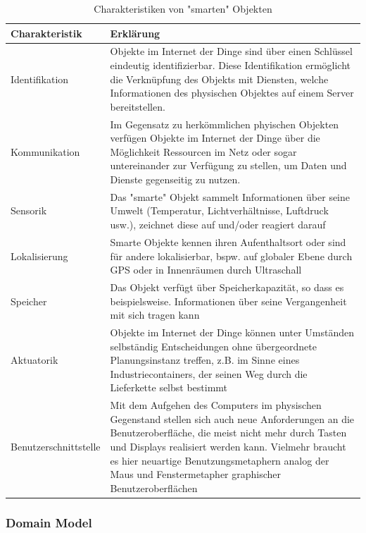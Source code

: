 \documentclass[a4paper, 12pt, twoside, headsepline=true]{scrartcl} %
\begin{document}
\begin{table}[H]
	\begin{tabularx}{\textwidth}{@{}lL@{}} 
		\toprule
		\textbf{Charakteristik} & \textbf{Erklärung} 
		\\ \midrule
		Identifikation & Objekte im Internet der Dinge sind über einen Schlüssel eindeutig identifizierbar. Diese Identifikation ermöglicht die Verknüpfung des Objekts mit Diensten, welche Informationen des physischen Objektes auf einem Server bereitstellen. 
		\\ \hline
		Kommunikation & Im Gegensatz zu herkömmlichen phyischen Objekten verfügen Objekte im Internet der Dinge über die Möglichkeit Ressourcen im Netz oder sogar untereinander zur Verfügung zu stellen, um Daten und Dienste gegenseitig zu nutzen.
		\\ \hline
		Sensorik & Das "smarte" Objekt sammelt Informationen über seine Umwelt (Temperatur, Lichtverhältnisse, Luftdruck usw.), zeichnet diese auf und/oder reagiert darauf
		\\ \hline
		Lokalisierung & Smarte Objekte kennen ihren Aufenthaltsort oder sind für andere lokalisierbar, bspw. auf globaler Ebene durch GPS oder in Innenräumen durch Ultraschall 
		\\ \hline
		Speicher & Das Objekt verfügt über Speicherkapazität, so dass es beispielsweise. Informationen über seine Vergangenheit mit sich tragen kann
		 \\ \hline
		Aktuatorik & Objekte im Internet der Dinge können unter Umständen selbständig Entscheidungen ohne übergeordnete Planungsinstanz treffen, z.B. im Sinne eines Industriecontainers, der seinen Weg durch die Lieferkette selbst bestimmt
		\\ \hline
		Benutzerschnittstelle & Mit dem Aufgehen des Computers im physischen Gegenstand stellen sich auch neue Anforderungen an die Benutzeroberfläche, die meist nicht mehr durch Tasten und Displays realisiert werden kann. Vielmehr braucht es hier neuartige Benutzungsmetaphern analog der Maus und Fenstermetapher graphischer Benutzeroberflächen
		\\ \hline
		\bottomrule
	\end{tabularx}
\caption{Charakteristiken von "smarten" Objekten\cite{iotwiki}}
\label{table:smartObjectsCharacteristics}
\end{table}


\subsubsection{Domain Model}
\end{document}
